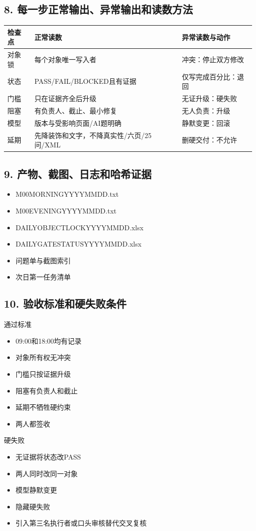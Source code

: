 \documentclass[UTF8,openany,zihao=-4]{ctexbook}
\renewcommand{\_}{\textunderscore\allowbreak}
\begin{document}
\subsection*{8. 每一步正常输出、异常输出和读数方法}
\noindent\begin{tabularx}{\textwidth}{@{}p{}XX@{}}
\toprule
\textbf{检查点} & \textbf{正常读数} & \textbf{异常读数与动作} \\
\midrule
对象锁 & 每个对象唯一写入者 & 冲突：停止双方修改 \\
状态 & PASS/FAIL/BLOCKED且有证据 & 仅写完成百分比：退回 \\
门槛 & 只在证据齐全后升级 & 无证升级：硬失败 \\
阻塞 & 有负责人、截止、最小修复 & 无人负责：升级 \\
模型 & 版本与受影响页面/AI题明确 & 静默变更：回滚 \\
延期 & 先降装饰和文字，不降真实性/六页/25问/XML & 删硬交付：不允许 \\
\bottomrule
\end{tabularx}

\subsection*{9. 产物、截图、日志和哈希证据}
\begin{itemize}[label=$\square$]
\item M00\_MORNING\_YYYYMMDD.txt
\item M00\_EVENING\_YYYYMMDD.txt
\item DAILY\_OBJECT\_LOCK\_YYYYMMDD.xlsx
\item DAILY\_GATE\_STATUS\_YYYYMMDD.xlsx
\item 问题单与截图索引
\item 次日第一任务清单
\end{itemize}

\subsection*{10. 验收标准和硬失败条件}
\begin{statusbox}{通过标准}
\begin{itemize}[label=$\square$]
\item 09:00和18:00均有记录
\item 对象所有权无冲突
\item 门槛只按证据升级
\item 阻塞有负责人和截止
\item 延期不牺牲硬约束
\item 两人都签收
\end{itemize}
\end{statusbox}
\begin{dangerbox}{硬失败}
\begin{itemize}
\item 无证据将状态改PASS
\item 两人同时改同一对象
\item 模型静默变更
\item 隐藏硬失败
\item 引入第三名执行者或口头审核替代交叉复核
\end{itemize}
\end{dangerbox}
\end{document}
